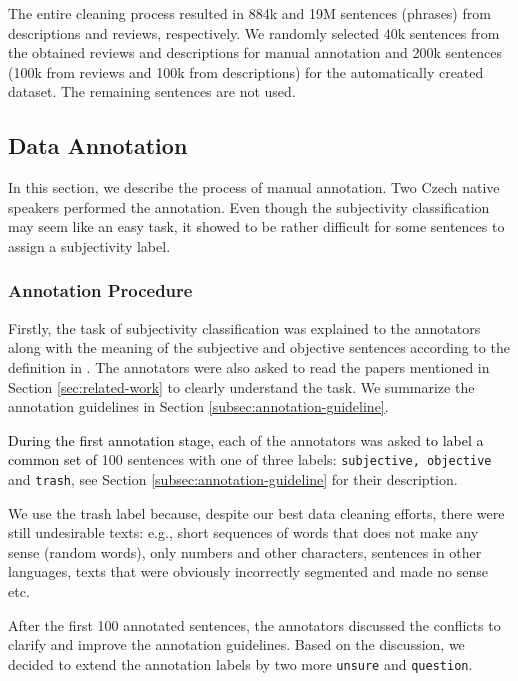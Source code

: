 \documentclass[10pt, a4paper]{article}
\begin{document}
\par The entire cleaning process resulted in 884k and 19M sentences (phrases) from descriptions and reviews, respectively. We randomly selected 40k sentences from the obtained reviews and descriptions for manual annotation and 200k sentences (100k from reviews and 100k from descriptions) for the automatically created dataset. The remaining sentences are not used.


\subsection{Data Annotation}
In this section, we describe the process of manual annotation. Two Czech native speakers performed the annotation. Even though the subjectivity classification may seem like an easy task, it showed to be rather difficult for some sentences to assign a subjectivity label.


\subsubsection{Annotation Procedure}
\label{subsubsec:annotation-procedure}
Firstly, the task of subjectivity classification was explained to the annotators along with the meaning of the subjective and objective sentences according to the definition in \cite{liu2012sentiment}. The annotators were also asked to read the papers mentioned in Section \ref{sec:related-work} to clearly understand the task. We summarize the annotation guidelines in Section \ref{subsec:annotation-guideline}.


\par \textcolor{black}{During the first annotation stage,} each of the annotators was asked \textcolor{black}{to label a common set of} 100 sentences with one of three labels: \texttt{subjective, objective} and \texttt{trash}, see Section \ref{subsec:annotation-guideline} for their description. 

\par We use the trash label because, despite our best data cleaning efforts, there were still undesirable texts: e.g., short sequences of words that does not make any sense (random words), only numbers and other characters, sentences in other languages, texts that were obviously incorrectly segmented and made no sense etc.    


After the first 100 annotated sentences, the annotators discussed the conflicts to clarify and improve the annotation guidelines. Based on the discussion, we decided to extend the annotation labels by two more \texttt{unsure} and \texttt{question}.
\end{document}
